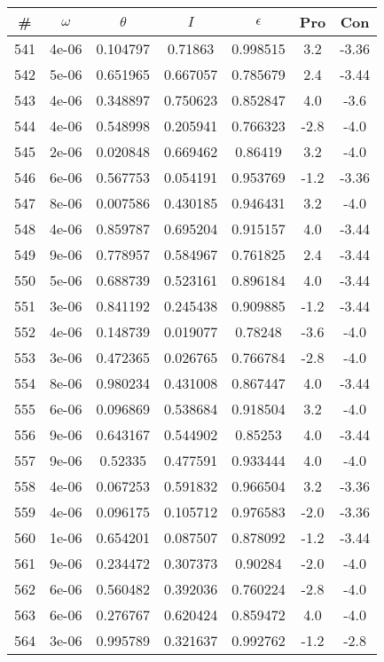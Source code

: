 \begin{table}
\begin{tabular}{c|c|c|c|c|c|c}
\# & $\omega$ & $\theta$ & $I$ & $\epsilon$ & Pro & Con\\
\hline
541 & 4e-06 & 0.104797 & 0.71863 & 0.998515 & 3.2 & -3.36\\
542 & 5e-06 & 0.651965 & 0.667057 & 0.785679 & 2.4 & -3.44\\
543 & 4e-06 & 0.348897 & 0.750623 & 0.852847 & 4.0 & -3.6\\
544 & 4e-06 & 0.548998 & 0.205941 & 0.766323 & -2.8 & -4.0\\
545 & 2e-06 & 0.020848 & 0.669462 & 0.86419 & 3.2 & -4.0\\
546 & 6e-06 & 0.567753 & 0.054191 & 0.953769 & -1.2 & -3.36\\
547 & 8e-06 & 0.007586 & 0.430185 & 0.946431 & 3.2 & -4.0\\
548 & 4e-06 & 0.859787 & 0.695204 & 0.915157 & 4.0 & -3.44\\
549 & 9e-06 & 0.778957 & 0.584967 & 0.761825 & 2.4 & -3.44\\
550 & 5e-06 & 0.688739 & 0.523161 & 0.896184 & 4.0 & -3.44\\
551 & 3e-06 & 0.841192 & 0.245438 & 0.909885 & -1.2 & -3.44\\
552 & 4e-06 & 0.148739 & 0.019077 & 0.78248 & -3.6 & -4.0\\
553 & 3e-06 & 0.472365 & 0.026765 & 0.766784 & -2.8 & -4.0\\
554 & 8e-06 & 0.980234 & 0.431008 & 0.867447 & 4.0 & -3.44\\
555 & 6e-06 & 0.096869 & 0.538684 & 0.918504 & 3.2 & -4.0\\
556 & 9e-06 & 0.643167 & 0.544902 & 0.85253 & 4.0 & -3.44\\
557 & 9e-06 & 0.52335 & 0.477591 & 0.933444 & 4.0 & -4.0\\
558 & 4e-06 & 0.067253 & 0.591832 & 0.966504 & 3.2 & -3.36\\
559 & 4e-06 & 0.096175 & 0.105712 & 0.976583 & -2.0 & -3.36\\
560 & 1e-06 & 0.654201 & 0.087507 & 0.878092 & -1.2 & -3.44\\
561 & 9e-06 & 0.234472 & 0.307373 & 0.90284 & -2.0 & -4.0\\
562 & 6e-06 & 0.560482 & 0.392036 & 0.760224 & -2.8 & -4.0\\
563 & 6e-06 & 0.276767 & 0.620424 & 0.859472 & 4.0 & -4.0\\
564 & 3e-06 & 0.995789 & 0.321637 & 0.992762 & -1.2 & -2.8\\

\end{tabular}
\end{table}
